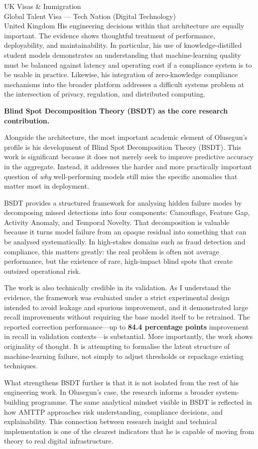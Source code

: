 \documentclass[12pt,a4paper]{letter}
\begin{document}
\begin{letter}{UK Visas \& Immigration\\
Global Talent Visa --- Tech Nation (Digital Technology)\\
United Kingdom}
His engineering decisions within that architecture are equally
important.  The evidence shows thoughtful treatment of performance,
deployability, and maintainability.  In particular, his use of
knowledge-distilled student models demonstrates an understanding that
machine-learning quality must be balanced against latency and operating
cost if a compliance system is to be usable in practice.  Likewise, his
integration of zero-knowledge compliance mechanisms into the broader
platform addresses a difficult systems problem at the intersection of
privacy, regulation, and distributed computing.

\textbf{Blind Spot Decomposition Theory (BSDT) as the core research
contribution.}

Alongside the architecture, the most important academic element of
Olusegun's profile is his development of Blind Spot Decomposition Theory
(BSDT).  This work is significant because it does not merely seek to
improve predictive accuracy in the aggregate.  Instead, it addresses the
harder and more practically important question of \textit{why}
well-performing models still miss the specific anomalies that matter most
in deployment.

BSDT provides a structured framework for analysing hidden failure modes
by decomposing missed detections into four components: Camouflage,
Feature Gap, Activity Anomaly, and Temporal Novelty.  That decomposition
is valuable because it turns model failure from an opaque residual into
something that can be analysed systematically.  In high-stakes domains
such as fraud detection and compliance, this matters greatly: the real
problem is often not average performance, but the existence of rare,
high-impact blind spots that create outsized operational risk.

The work is also technically credible in its validation.  As I
understand the evidence, the framework was evaluated under a strict
experimental design intended to avoid leakage and spurious improvement,
and it demonstrated large recall improvements without requiring the base
model itself to be retrained.  The reported correction performance---up
to \textbf{84.4 percentage points} improvement in recall in validation
contexts---is substantial.  More importantly, the work shows originality
of thought.  It is attempting to formalise the latent structure of
machine-learning failure, not simply to adjust thresholds or repackage
existing techniques.

What strengthens BSDT further is that it is not isolated from the rest
of his engineering work.  In Olusegun's case, the research informs a
broader system-building programme.  The same analytical mindset visible
in BSDT is reflected in how AMTTP approaches risk understanding,
compliance decisions, and explainability.  This connection between
research insight and technical implementation is one of the clearest
indicators that he is capable of moving from theory to real digital
infrastructure.


\end{letter}
\end{document}
